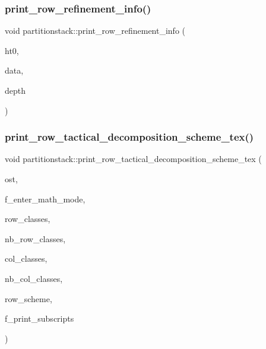 \subsubsection{\texorpdfstring{print\+\_\+row\+\_\+refinement\+\_\+info()}{print\_row\_refinement\_info()}}
{\footnotesize\ttfamily void partitionstack\+::print\+\_\+row\+\_\+refinement\+\_\+info (\begin{DoxyParamCaption}\item[{\mbox{\hyperlink{galois_8h_a09fddde158a3a20bd2dcadb609de11dc}{I\+NT}}}]{ht0,  }\item[{\mbox{\hyperlink{galois_8h_a09fddde158a3a20bd2dcadb609de11dc}{I\+NT}} $\ast$}]{data,  }\item[{\mbox{\hyperlink{galois_8h_a09fddde158a3a20bd2dcadb609de11dc}{I\+NT}}}]{depth }\end{DoxyParamCaption})}

\mbox{\label{classpartitionstack_ae4b0ff95426d127e85b655652676c1e2}} 
\subsubsection{\texorpdfstring{print\+\_\+row\+\_\+tactical\+\_\+decomposition\+\_\+scheme\+\_\+tex()}{print\_row\_tactical\_decomposition\_scheme\_tex()}}
{\footnotesize\ttfamily void partitionstack\+::print\+\_\+row\+\_\+tactical\+\_\+decomposition\+\_\+scheme\+\_\+tex (\begin{DoxyParamCaption}\item[{ostream \&}]{ost,  }\item[{\mbox{\hyperlink{galois_8h_a09fddde158a3a20bd2dcadb609de11dc}{I\+NT}}}]{f\+\_\+enter\+\_\+math\+\_\+mode,  }\item[{\mbox{\hyperlink{galois_8h_a09fddde158a3a20bd2dcadb609de11dc}{I\+NT}} $\ast$}]{row\+\_\+classes,  }\item[{\mbox{\hyperlink{galois_8h_a09fddde158a3a20bd2dcadb609de11dc}{I\+NT}}}]{nb\+\_\+row\+\_\+classes,  }\item[{\mbox{\hyperlink{galois_8h_a09fddde158a3a20bd2dcadb609de11dc}{I\+NT}} $\ast$}]{col\+\_\+classes,  }\item[{\mbox{\hyperlink{galois_8h_a09fddde158a3a20bd2dcadb609de11dc}{I\+NT}}}]{nb\+\_\+col\+\_\+classes,  }\item[{\mbox{\hyperlink{galois_8h_a09fddde158a3a20bd2dcadb609de11dc}{I\+NT}} $\ast$}]{row\+\_\+scheme,  }\item[{\mbox{\hyperlink{galois_8h_a09fddde158a3a20bd2dcadb609de11dc}{I\+NT}}}]{f\+\_\+print\+\_\+subscripts }\end{DoxyParamCaption})}


